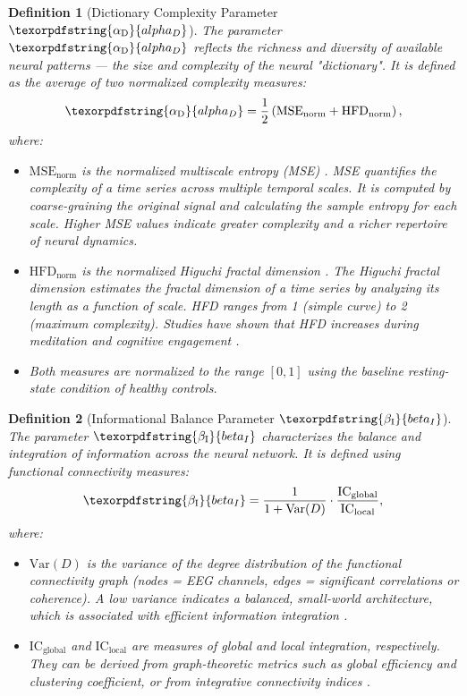 \documentclass[12pt,a4paper]{article}
\newtheorem{definition}{Definition}
\DeclareRobustCommand{\alD}{\texorpdfstring{\ensuremath{\alpha_{\mathrm{D}}}}{alpha_D}}
\DeclareRobustCommand{\beI}{\texorpdfstring{\ensuremath{\beta_{\mathrm{I}}}}{beta_I}}
\begin{document}
	\begin{definition}[Dictionary Complexity Parameter \(\alD\)]
		The parameter \(\alD\) reflects the richness and diversity of available neural patterns — the size and complexity of the neural "dictionary". It is defined as the average of two normalized complexity measures:
		\begin{equation}
			\alD = \frac{1}{2}\left(\text{MSE}_{\text{norm}} + \text{HFD}_{\text{norm}}\right),
			\label{eq:alphaD_math}
		\end{equation}
		where:
		\begin{itemize}
			\item \(\text{MSE}_{\text{norm}}\) is the normalized multiscale entropy (MSE) \cite{Costa2005}. MSE quantifies the complexity of a time series across multiple temporal scales. It is computed by coarse-graining the original signal and calculating the sample entropy for each scale. Higher MSE values indicate greater complexity and a richer repertoire of neural dynamics.
			\item \(\text{HFD}_{\text{norm}}\) is the normalized Higuchi fractal dimension \cite{Higuchi1988}. The Higuchi fractal dimension estimates the fractal dimension of a time series by analyzing its length as a function of scale. HFD ranges from 1 (simple curve) to 2 (maximum complexity). Studies have shown that HFD increases during meditation and cognitive engagement \cite{Kozhemyako2017}.
			\item Both measures are normalized to the range \([0,1]\) using the baseline resting-state condition of healthy controls.
		\end{itemize}
	\end{definition}
	
	\begin{definition}[Informational Balance Parameter \(\beI\)]
		The parameter \(\beI\) characterizes the balance and integration of information across the neural network. It is defined using functional connectivity measures:
		\begin{equation}
			\beI = \frac{1}{1 + \text{Var}(D)} \cdot \frac{\text{IC}_{\text{global}}}{\text{IC}_{\text{local}}},
			\label{eq:betaI_math}
		\end{equation}
		where:
		\begin{itemize}
			\item \(\text{Var}(D)\) is the variance of the degree distribution of the functional connectivity graph (nodes = EEG channels, edges = significant correlations or coherence). A low variance indicates a balanced, small-world architecture, which is associated with efficient information integration \cite{Stam2014}.
			\item \(\text{IC}_{\text{global}}\) and \(\text{IC}_{\text{local}}\) are measures of global and local integration, respectively. They can be derived from graph-theoretic metrics such as global efficiency and clustering coefficient, or from integrative connectivity indices \cite{Kumar2024}.
		\end{itemize}
	\end{definition}
	
\end{document}
